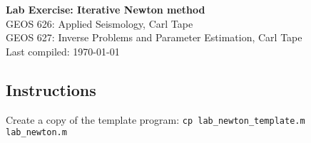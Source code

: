 \documentclass[11pt,titlepage,fleqn]{article}
\begin{document}

\begin{spacing}{1.2}
\centering
{\large \bf Lab Exercise: Iterative Newton method} \\
GEOS 626: Applied Seismology, Carl Tape \\
GEOS 627: Inverse Problems and Parameter Estimation, Carl Tape \\
Last compiled: \today
\end{spacing}


\subsection*{Instructions}

Create a copy of the template program: \verb+cp lab_newton_template.m lab_newton.m+
\end{document}
